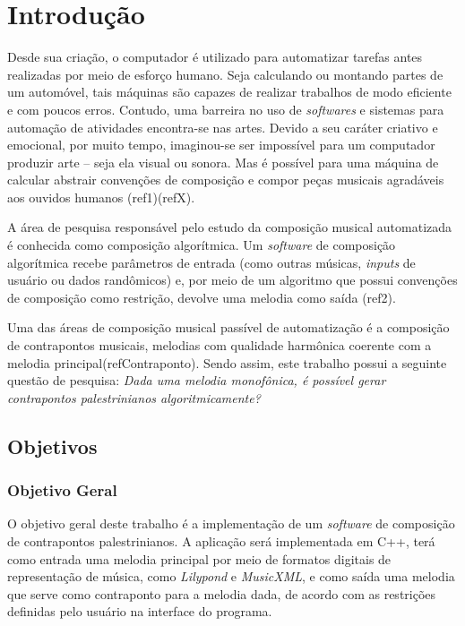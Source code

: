 \chapter*[Introdução]{Introdução}

  Desde sua criação, o computador é utilizado para automatizar tarefas antes realizadas por meio de esforço humano. Seja calculando ou montando partes de um automóvel, tais máquinas são capazes de realizar trabalhos de modo eficiente e com poucos erros. Contudo, uma barreira no uso de \textit{softwares} e sistemas para automação de atividades encontra-se nas artes. Devido a seu caráter criativo e emocional, por muito tempo, imaginou-se ser impossível para um computador produzir arte -- seja ela visual ou sonora. Mas é possível para uma máquina de calcular abstrair convenções de composição e compor peças musicais agradáveis aos ouvidos humanos (ref1)(refX).

  A área de pesquisa responsável pelo estudo da composição musical automatizada é conhecida como composição algorítmica. Um \textit{software} de composição algorítmica recebe parâmetros de entrada (como outras músicas, \textit{inputs} de usuário ou dados randômicos) e, por meio de um algoritmo que possui convenções de composição como restrição, devolve uma melodia como saída (ref2).

  Uma das áreas de composição musical passível de automatização é a composição de contrapontos musicais, melodias com qualidade harmônica coerente com a melodia principal(refContraponto). Sendo assim, este trabalho possui a seguinte questão de pesquisa: \textit{Dada uma melodia monofônica, é possível gerar contrapontos palestrinianos algoritmicamente?}

  \section*{Objetivos}

    \subsection*{Objetivo Geral}

      O objetivo geral deste trabalho é a implementação de um \textit{software} de composição de contrapontos palestrinianos. A aplicação será implementada em C++, terá como entrada uma melodia principal por meio de formatos digitais de representação de música, como \textit{Lilypond}\footnotemark {} e \textit{MusicXML}\footnotemark {}, e como saída uma melodia que serve como contraponto para a melodia dada, de acordo com as restrições definidas pelo usuário na interface do programa.



